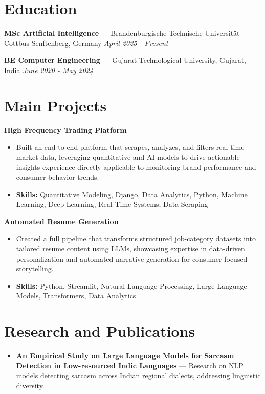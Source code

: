 \documentclass[a4paper,10pt]{article}
\begin{document}
\section*{Education}
\textbf{MSc Artificial Intelligence} — Brandenburgische Technische Universität Cottbus-Senftenberg, Germany \hfill \textit{April 2025 - Present}\par
\vspace{1.5pt}
\textbf{BE Computer Engineering} — Gujarat Technological University, Gujarat, India \hfill \textit{June 2020 - May 2024}\par

\section*{Main Projects}
\textbf{High Frequency Trading Platform}\par
\vspace{1pt}
\begin{itemize}
  \item Built an end-to-end platform that scrapes, analyzes, and filters real-time market data, leveraging quantitative and AI models to drive actionable insights-experience directly applicable to monitoring brand performance and consumer behavior trends.
  \item \textbf{Skills:} Quantitative Modeling, Django, Data Analytics, Python, Machine Learning, Deep Learning, Real-Time Systems, Data Scraping
\end{itemize}
\vspace{3pt}
\textbf{Automated Resume Generation}\par
\vspace{1pt}
\begin{itemize}
  \item Created a full pipeline that transforms structured job-category datasets into tailored resume content using LLMs, showcasing expertise in data-driven personalization and automated narrative generation for consumer-focused storytelling.
  \item \textbf{Skills:} Python, Streamlit, Natural Language Processing, Large Language Models, Transformers, Data Analytics
\end{itemize}

\section*{Research and Publications}
\begin{itemize}
\item \textbf{An Empirical Study on Large Language Models for Sarcasm Detection in Low-resourced Indic Languages} — Research on NLP models detecting sarcasm across Indian regional dialects, addressing linguistic diversity.
\end{itemize}
\end{document}
